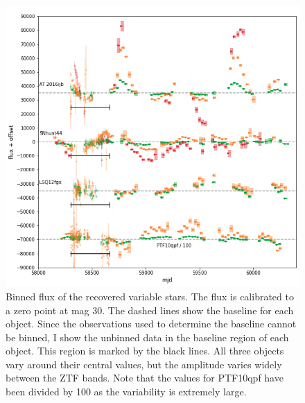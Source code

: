 \documentclass[a4paper,oneside,12pt, class=Latex/Classes/PhDthesisPSnPDF, crop=false]{standalone}
\begin{document}
\begin{figure}
    \centering
    \includegraphics[width=\textwidth]{../Images/chapter_4/non-transients_varstar.png}
    \caption[Binned flux of the recovered variable stars.]{Binned flux of the recovered variable stars. The flux is calibrated to a zero point at mag 30. The dashed lines show the baseline for each object. Since the observations used to determine the baseline cannot be binned, I show the unbinned data in the baseline region of each object. This region is marked by the black lines. All three objects vary around their central values, but the amplitude varies widely between the ZTF bands. Note that the values for PTF10qpf have been divided by 100 as the variability is extremely large.}
    \label{non-transients_varstar}
\end{figure}
\end{document}
